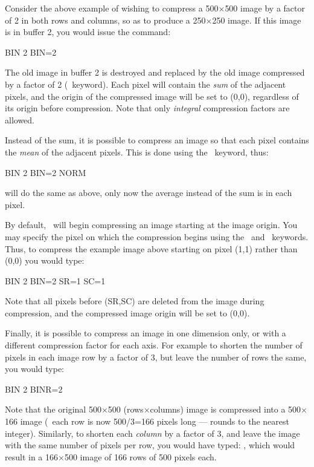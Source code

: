 Consider the above example of wishing to compress a 500$\times$500 image
by a factor of 2 in both rows and columns, so as to produce a
250$\times$250 image.  If this image is in buffer 2, you would issue
the command:
\begin{command}
      \item BIN 2 BIN=2
\end{command}
The old image in buffer 2 is destroyed and replaced by the old image
compressed by a factor of 2 (\ keyword).  Each pixel will contain
the {\it sum} of the adjacent pixels, and the origin of the compressed image
will be set to (0,0), regardless of its origin before compression.  Note that
only {\it integral} compression factors are allowed. 

Instead of the sum, it is possible to compress an image so that each pixel
contains the {\it mean} of the adjacent pixels.  This is done using the
\ keyword, thus: 
\begin{command}
      \item BIN 2 BIN=2 NORM
\end{command}
will do the same as above, only now the average instead of the sum is in each
pixel. 

By default, \ will begin compressing an image starting at the image
origin.  You may specify the pixel on which the compression begins using the
\ and \ keywords.  Thus, to compress the example image
above starting on pixel (1,1) rather than (0,0) you would type: 
\begin{command}
      \item BIN 2 BIN=2 SR=1 SC=1
\end{command}
Note that all pixels before (SR,SC) are deleted from the image during
compression, and the compressed image origin will be set to (0,0). 

Finally, it is possible to compress an image in one dimension only, or with a
different compression factor for each axis.  For example to shorten the number
of pixels in each image row by a factor of 3, but leave the number of rows the
same, you would type: 
\begin{command}
       \item BIN 2 BINR=2
\end{command}
Note that the original 500$\times$500 (rows$\times$columns) image is
compressed into a 500$\times$166 image (\ie\ each row is now 500/3=166 pixels
long ---  rounds to the nearest integer).  Similarly, to shorten
each {\it column} by a factor of 3, and leave the image with the same number
of pixels per row, you would have typed:  , which would
result in a 166$\times$500 image of 166 rows of 500 pixels each. 

